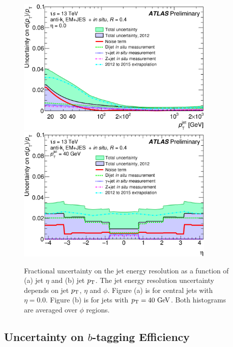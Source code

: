 \begin{figure}[!h]
\begin{center}
\includegraphics[width=0.85\textwidth]{figures/JetCalib/JER_pt.png}
\includegraphics[width=0.85\textwidth]{figures/JetCalib/JER_eta.png}
\caption[Fractional uncertainty on the jet energy resolution as a function of jet $\eta$ and jet $\pt$.]{Fractional uncertainty on the jet energy resolution as a function of (a) jet $\eta$ and (b) jet $\pt$.  The jet energy resolution uncertainty depends on jet $\pt$, $\eta$ and $\phi$.  Figure (a) is for central jets with $\eta = 0.0$.  Figure (b) is for jets with $\pt = 40 \gev$.  Both histograms are averaged over $\phi$ regions. }
\label{fig:sys:JER}
\end{center}
\end{figure}

\subsection{Uncertainty on $b$-tagging Efficiency}

